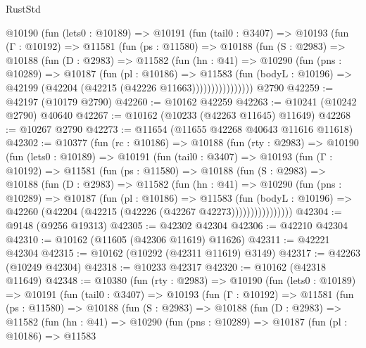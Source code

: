 \begin{lexlean}{RustStd}
\begin{coremodule}
        @10190
          (fun (lets0 : @10189) =>
          @10191
            (fun (tail0 : @3407) =>
            @10193
              (fun (Γ : @10192) =>
              @11581
                (fun (ps : @11580) =>
                @10188
                  (fun (S : @2983) =>
                  @10188
                    (fun (D : @2983) =>
                    @11582
                      (fun (hn : @41) =>
                      @10290
                        (fun (pns : @10289) =>
                        @10187
                          (fun (pl : @10186) =>
                          @11583
                            (fun (bodyL : @10196) =>
                            @42199 (@42204 (@42215 (@42226 @11663))))))))))))))))
    @2790
@42259 := @42197 (@10179 @2790)
@42260 := @10162 @42259
@42263 := @10241 (@10242 @2790) @40640
@42267 := @10162 (@10233 (@42263 @11645) @11649)
@42268 := @10267 @2790
@42273 := @11654 (@11655 @42268 @40643 @11616 @11618)
@42302 := @10377
    (fun (rc : @10186) =>
    @10188
      (fun (rty : @2983) =>
      @10190
        (fun (lets0 : @10189) =>
        @10191
          (fun (tail0 : @3407) =>
          @10193
            (fun (Γ : @10192) =>
            @11581
              (fun (ps : @11580) =>
              @10188
                (fun (S : @2983) =>
                @10188
                  (fun (D : @2983) =>
                  @11582
                    (fun (hn : @41) =>
                    @10290
                      (fun (pns : @10289) =>
                      @10187
                        (fun (pl : @10186) =>
                        @11583
                          (fun (bodyL : @10196) =>
                          @42260 (@42204 (@42215 (@42226 (@42267 @42273))))))))))))))))
@42304 := @9148 (@9256 @19313)
@42305 := @42302 @42304
@42306 := @42210 @42304
@42310 := @10162 (@11605 (@42306 @11619) @11626)
@42311 := @42221 @42304
@42315 := @10162 (@10292 (@42311 @11619) @3149)
@42317 := @42263 (@10249 @42304)
@42318 := @10233 @42317
@42320 := @10162 (@42318 @11649)
@42348 := @10380
    (fun (rty : @2983) =>
    @10190
      (fun (lets0 : @10189) =>
      @10191
        (fun (tail0 : @3407) =>
        @10193
          (fun (Γ : @10192) =>
          @11581
            (fun (ps : @11580) =>
            @10188
              (fun (S : @2983) =>
              @10188
                (fun (D : @2983) =>
                @11582
                  (fun (hn : @41) =>
                  @10290
                    (fun (pns : @10289) =>
                    @10187
                      (fun (pl : @10186) =>
                      @11583

\end{coremodule}
\end{lexlean}
